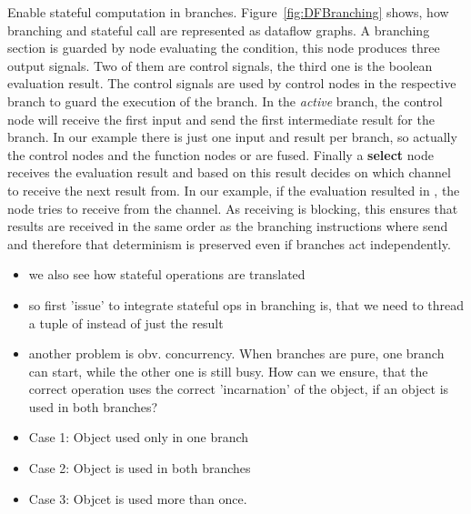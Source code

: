 \documentclass{scrartcl}
\begin{document}
Enable stateful computation in branches. Figure~\ref{fig:DFBranching} shows, how branching and stateful call are represented as dataflow graphs. A branching section is guarded by node evaluating the condition, this node produces three output signals. Two of them are control signals, the third one is the boolean evaluation result. The control signals are used by control nodes in the respective branch to guard the execution of the branch. In the \emph{active} branch, the control node will receive the first input and send the first intermediate result for the branch. In our example there is just one input and result per branch, so actually the control nodes and the function nodes  or  are fused. Finally a \textbf{select} node receives the evaluation result and based on this result decides on which channel to receive the next result from. In our example, if the evaluation resulted in , the  node tries to receive from the  channel. As receiving is blocking, this ensures that results are received in the same order as the branching instructions where send and therefore that determinism is preserved even if branches act independently.  
\begin{itemize}
    \item we also see how stateful operations are translated
    \item so first 'issue' to integrate stateful ops in branching is, that we need to thread a tuple of  instead of just the result
    \item another problem is obv. concurrency. When branches are pure, one branch can start, while the other one is still busy. How can we ensure, that the correct operation uses the correct 'incarnation' of the object, if an object is used in both branches?
    \item Case 1: Object used only in one branch
    \item Case 2: Object is used in both branches
    \item Case 3: Objcet is used more than once.
\end{itemize}
\end{document}
